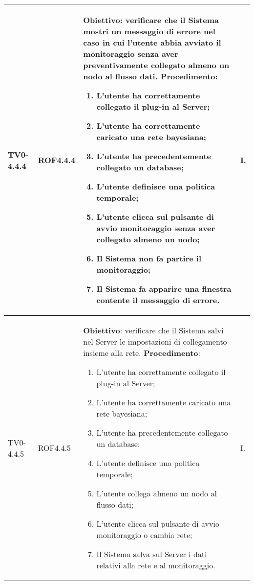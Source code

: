 \begin{longtable}{|C{.15\textwidth}|C{.13\textwidth}|m{.52\textwidth}|C{.08\textwidth}|}
TV0-4.4.4 & ROF4.4.4 &
	\textbf{Obiettivo}: verificare che il Sistema mostri un messaggio di errore nel caso in cui l'utente abbia avviato il monitoraggio senza aver preventivamente  collegato almeno un nodo al flusso dati. \newline
	\textbf{Procedimento}:
	\begin{enumerate}
		\item L'utente ha correttamente collegato il plug-in al Server;
		\item L'utente ha correttamente caricato una rete bayesiana;
		\item L'utente ha precedentemente collegato un database;
		\item L'utente definisce una politica temporale;
		\item L'utente clicca sul pulsante di avvio monitoraggio senza aver collegato almeno un nodo;
		\item Il Sistema non fa partire il monitoraggio;
		\item Il Sistema fa apparire una finestra contente il messaggio di errore.
	\end{enumerate}
	& I. \\
\hline

TV0-4.4.5 & ROF4.4.5 &
	\textbf{Obiettivo}: verificare che il Sistema salvi nel Server le impostazioni di collegamento insieme alla rete. \newline
	\textbf{Procedimento}:
	\begin{enumerate}
		\item L'utente ha correttamente collegato il plug-in al Server;
		\item L'utente ha correttamente caricato una rete bayesiana;
		\item L'utente ha precedentemente collegato un database;
		\item L'utente definisce una politica temporale;
		\item L'utente collega almeno un nodo al flusso dati;
		\item L'utente clicca sul pulsante di avvio monitoraggio o cambia rete;
		\item Il Sistema salva sul Server i dati relativi alla rete e al monitoraggio.	
	\end{enumerate}
	& I. \\
\hline


\end{longtable}
